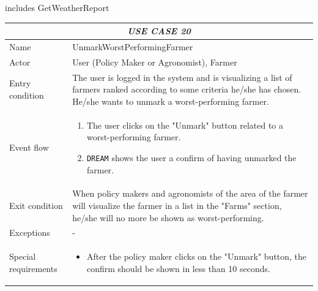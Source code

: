 \documentclass{article}
\begin{document}
\color{red}
includes GetWeatherReport
\color{black}


\centering
\begin{longtable}{|p{3.5cm}|m{8cm}|}
 \hline
 \multicolumn{2}{|c|}{\cellcolor{white}\emph{USE CASE 20}} \\
 \endfirsthead
 \endhead
 \endfoot
 \endlastfoot
 \hline
 Name & UnmarkWorstPerformingFarmer\\
 \hline
 Actor & User (Policy Maker or Agronomist), Farmer\\
 \hline
 Entry condition & The user is logged in the system and is visualizing a list of farmers ranked according to some criteria he/she has chosen. He/she wants to unmark a worst-performing farmer.\\
 \hline
 Event flow & \begin{enumerate}
    \item The user clicks on the "Unmark" button related to a worst-performing farmer.
    \item \verb|DREAM| shows the user a confirm of having unmarked the farmer.
 \end{enumerate}\\
 \hline
 Exit condition &  When policy makers and agronomists of the area of the farmer will visualize the farmer in a list in the "Farms" section, he/she will no more be shown as worst-performing.\\
 \hline
 Exceptions & -\\
 \hline
 Special requirements &\begin{itemize}
     \item After the policy maker clicks on the "Unmark" button, the confirm should be shown in less than 10 seconds.
 \end{itemize}\\
 \hline
\end{longtable}
\end{document}
